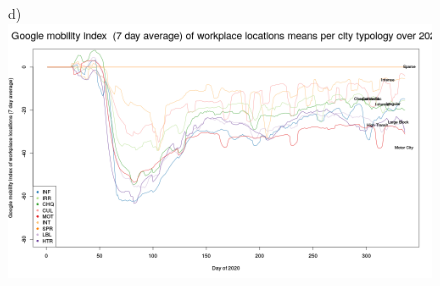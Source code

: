 \documentclass[preprint,12pt]{elsarticle}
\begin{document}
\begin{figure}
{\tiny d)}\includegraphics[trim={0 19 22 43},clip,scale=0.23]{Images/GoogleWorkplacesClusterMean7Ave_2020.png}


\end{figure}
\end{document}
